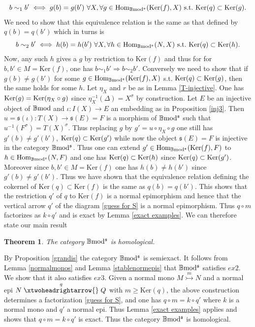 \documentclass[12pt]{article}
\newtheorem{thm}{Theorem}[section]
\def\Hom{{\rm Hom}}
\def\Ker{{\rm Ker}}
\def\B{{\mathbb B}}
\def\ker{{\mbox{Ker}}}
\def\Hom {{\mbox{Hom}}}
\def\yb{\mathfrak{s}}
\def\bmod{{\rm \B mod}}
\def\b2{{\rm \B mod^{\mathfrak s}}}
\begin{document}
$$
 b\sim_1 b'\iff g(b)=g(b')\ \forall X, \forall g\in \Hom_\b2(\ker(f),X)~{\rm s.t.}~ \ker(q)\subset \Ker(g).$$
 We need to show that this equivalence relation  is the same as that defined by $q(b)=q(b')$ which in turns is 
 $$
 b\sim_2 b'\iff h(b)=h(b')\ \forall X, \forall h\in \Hom_\b2(N,X)~{\rm s.t.}~ \ker(q)\subset \Ker(h).$$
Now, any such $h$ gives a $g$ by restriction to $\ker(f)$ and thus for for $b,b'\in M =\ker(f)$, one has $b\sim_1 b'\Rightarrow b\sim_2 b'$. Conversely we need to show that if $g(b)\neq g(b')$ for some $g\in \Hom_\b2(\ker(f),X)$ s.t. $\ker(q)\subset \Ker(g)$, then the same holds for some $h$.  Let $\eta_X$  and $r$ be as in Lemma \ref{T-injective}. One has $\Ker(g)=\ker(\eta_X\circ g)$ since $\eta_X^{-1}(\Delta)=X^\sigma$ by construction. Let $E$ be an injective object of $\bmod$ and $\iota:I(X)\to E$ an embedding as in Proposition \ref{inj3}. Then $u=\yb(\iota):T(X)\to \yb(E)=F$ is a morphism of $\b2$ such that $u^{-1}(F^\sigma)=T(X)^\sigma$. Thus replacing $g$ by $g'=u\circ \eta_X\circ g$ one still has $g'(b)\neq g'(b')$, $\ker(q)\subset \Ker(g')$ while now the object $\yb(E)=F$ is injective in the category $\b2$. Thus one can extend $g'\in \Hom_\b2(\ker(f),F)$ to $h\in \Hom_\b2(N,F)$ and one has $\ker(q)\subset \Ker(h)$ since $\ker(q)\subset \Ker(g')$. Moreover since $b,b'\in M =\ker(f)$ one has $h(b)\neq h(b')$ since $g'(b)\neq g'(b')$. Thus we have shown that the equivalence relation defining the cokernel of $\ker(q)\subset \ker(f)$ is the same as $q(b)=q(b')$. This shows that the restriction $q'$ of $q$ to $\ker(f)$ is a normal epimorphism and hence that the vertical arrow $q'$ of the diagram \eqref{guess for S} is a normal epimorphism. Thus $q\circ m$ factorizes as $k\circ q'$ and is exact by Lemma \ref{exact examples}. 
We can therefore state our main result
\begin{thm}\label{homological} The category $\b2$ is homological.	
\end{thm}
\proof By Proposition \ref{grandis} the category $\b2$ is semiexact. It follows from Lemma \ref{normalmonos} and Lemma \ref{stablenormepis} that $\b2$ satisfies $ex2$. We show that  it also satisfies $ex3$. Given a normal mono $M\stackrel{m}{\rightarrowtail} N$ and a normal epi $N\stackrel{q}{\xtwoheadrightarrow{}} Q$ with $m\geq \ker(q)$, the above construction determines a factorization \eqref{guess for S}, and one has $q\circ m=k\circ q'$ where $k$ is a normal mono and $q'$ a normal epi. Thus Lemma \ref{exact examples} applies and shows that $q\circ m=k\circ q'$ is exact. Thus the category $\b2$ is homological. \endproof 
\end{document}

